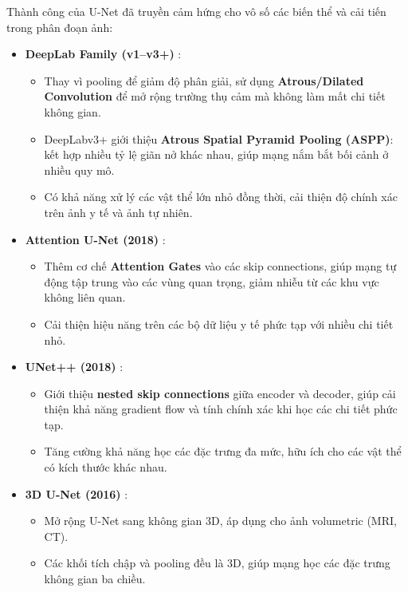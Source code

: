 Thành công của U-Net đã truyền cảm hứng cho vô số các biến thể và cải tiến trong phân đoạn ảnh:

\begin{itemize}
	\item \textbf{DeepLab Family (v1–v3+)} \cite{Chen2017}: 
	\begin{itemize}
		\item Thay vì pooling để giảm độ phân giải, sử dụng \textbf{Atrous/Dilated Convolution} để mở rộng trường thụ cảm mà không làm mất chi tiết không gian.
		\item DeepLabv3+ giới thiệu \textbf{Atrous Spatial Pyramid Pooling (ASPP)}: kết hợp nhiều tỷ lệ giãn nở khác nhau, giúp mạng nắm bắt bối cảnh ở nhiều quy mô.
		\item Có khả năng xử lý các vật thể lớn nhỏ đồng thời, cải thiện độ chính xác trên ảnh y tế và ảnh tự nhiên.
	\end{itemize}
	
	\item \textbf{Attention U-Net (2018)} \cite{Oktay2018}: 
	\begin{itemize}
		\item Thêm cơ chế \textbf{Attention Gates} vào các skip connections, giúp mạng tự động tập trung vào các vùng quan trọng, giảm nhiễu từ các khu vực không liên quan.
		\item Cải thiện hiệu năng trên các bộ dữ liệu y tế phức tạp với nhiều chi tiết nhỏ.
	\end{itemize}
	
	\item \textbf{UNet++ (2018)} \cite{Zhou2018}: 
	\begin{itemize}
		\item Giới thiệu \textbf{nested skip connections} giữa encoder và decoder, giúp cải thiện khả năng gradient flow và tính chính xác khi học các chi tiết phức tạp.
		\item Tăng cường khả năng học các đặc trưng đa mức, hữu ích cho các vật thể có kích thước khác nhau.
	\end{itemize}
	
	\item \textbf{3D U-Net (2016)} \cite{Cicek2016}: 
	\begin{itemize}
		\item Mở rộng U-Net sang không gian 3D, áp dụng cho ảnh volumetric (MRI, CT).
		\item Các khối tích chập và pooling đều là 3D, giúp mạng học các đặc trưng không gian ba chiều.
	\end{itemize}
	

\end{itemize}
